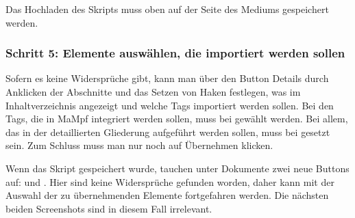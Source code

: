 \documentclass[parskip=off,index=totocnumbered]{scrartcl}
\newenvironment{rückkeinstück}
	{\begin{adjustwidth}{0cm}{0cm}\footnotesize \singlespace \centering} 
	{\end{adjustwidth} \onehalfspacing}
\newenvironment{rückkeinstück2}
	{\begin{adjustwidth}{0cm}{0cm}\footnotesize \singlespace} 
	{\end{adjustwidth} \onehalfspacing}
\begin{document}
\noindent \begin{minipage}{\textwidth}
    \begin{rückkeinstück}
        Das Hochladen des Skripts muss oben auf der Seite des Mediums gespeichert werden.
        \vspace{0.6cm}
    \end{rückkeinstück}
\end{minipage}

  
\subsubsection*{Schritt 5: Elemente auswählen, die importiert werden sollen}
Sofern es keine Widersprüche gibt, kann man über den Button \colorbox{LightSteelBlue3!60!}{\textsf{Details}} durch Anklicken der Abschnitte und das Setzen von Haken festlegen, was im Inhaltverzeichnis angezeigt und welche Tags importiert werden sollen. Bei den Tags, die in MaMpf integriert werden sollen, muss \checked bei \tagme gewählt werden. Bei allem, das in der detaillierten Gliederung aufgeführt werden sollen, muss \toggleon bei \eye gesetzt sein. Zum Schluss muss man nur noch auf \colorbox{LightSteelBlue3!60!}{\textsf{Übernehmen}} klicken.
\vspace{0.6cm}
            
\noindent \begin{minipage}{\textwidth}
    \begin{rückkeinstück2}
        Wenn das Skript gespeichert wurde, tauchen unter \textsf{Dokumente} zwei neue Buttons auf:  und . Hier sind keine Widersprüche gefunden worden, daher kann mit der Auswahl der zu übernehmenden Elemente fortgefahren werden. Die nächsten beiden Screenshots sind in diesem Fall irrelevant.
        \vspace{0.3cm}
    \end{rückkeinstück2}
\end{minipage}
\end{document}
